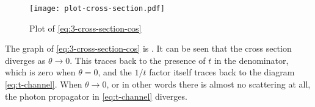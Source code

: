 \documentclass[hyperref, a4paper]{article}
\begin{document}
\begin{figure}
    \centering
    \texttt{[image: plot-cross-section.pdf]}
    \caption{Plot of \eqref{eq:3-cross-section-cos}}
    \label{fig:cross-section-cos}
\end{figure}

The graph of \eqref{eq:3-cross-section-cos} is . It can be seen that the 
cross section diverges as $\theta \to 0$. This traces back to the presence of $t$ in the denominator, which 
is zero when $\theta = 0$, and the $1 / t$ factor itself traces back to the diagram \eqref{eq:t-channel}. 
When $\theta \to 0$, or in other words there is almost no scattering at all, the photon propagator in 
\eqref{eq:t-channel} diverges.
\end{document}
